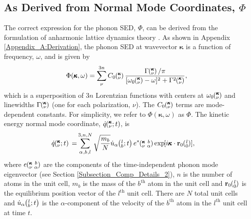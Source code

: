 \subsection{\label{S:Subsection_NMD}As Derived from Normal Mode 
Coordinates, $\Phi$}
The correct expression for the phonon SED, $\Phi$, can be derived from 
the formulation of anharmonic 
lattice dynamics theory 
\cite{maradudin_dynamical_1974,wallace_thermodynamics_1972,
dove_introduction_1993,srivastava_physics_1990}. 
As shown in Appendix \ref{Appendix_A:Derivation}, 
the phonon SED at wavevector $\pmb{\kappa}$ 
is a function of frequency, $\omega$, 
and is given by
\begin{equation}\label{E:Lorentzian_NMD}
\begin{split}
\Phi(\pmb{\kappa},\omega) = \sum_{\nu}^{3n}C_0\kv\frac{\Gamma\kv/\pi}
{[\omega_0\kv-\omega]^2+\Gamma^2\kv},
\end{split}
\end{equation}
which is a superposition of $3n$ Lorentzian functions with centers at 
$\omega_0\mspace{-4.0mu}\left(\mspace{-8.0mu} \begin{smallmatrix}&\pmb{\kappa} \\&\nu\end{smallmatrix} \mspace{-3.0mu}\right)$ and linewidths 
$\Gamma \mspace{-4.0mu}\left(\mspace{-8.0mu} \begin{smallmatrix}&\pmb{\kappa} \\&\nu\end{smallmatrix} \mspace{-3.0mu}\right)$ (one for each polarization, $\nu$). The $C_0 \mspace{-4.0mu}\left(\mspace{-8.0mu} \begin{smallmatrix}&\pmb{\kappa} \\&\nu\end{smallmatrix} \mspace{-3.0mu}\right)$ terms 
are mode-dependent constants. 
For simplicity, we refer to $\Phi(\pmb{\kappa},\omega)$ as $\Phi$. 
The kinetic energy normal mode coordinate, $\dot{q}\mspace{-4.0mu}\left(\mspace{-8.0mu} \begin{smallmatrix}&\pmb{\kappa} \\&\nu\end{smallmatrix} \mspace{-2.0mu};t\right)$, is 
\cite{dove_introduction_1993}
\begin{equation}\label{E:qdot_HLD}
\begin{split}
\dot{q}\kvt{}{}{}=&\SUM{0}{}\sqrt{\frac{m_b}{N}}\dot{u}_{\alpha}\lbt 
e^*\kvba\EXP{i\pmb{\kappa}\cdot\mathbf{r}_0\ab{l}{0}},
\end{split}
\end{equation}
where $e\mspace{-4.0mu}\left(\mspace{-8.0mu} \begin{smallmatrix} &\pmb{\kappa} &b \\ &\nu &\alpha\end{smallmatrix} \mspace{-3.0mu}\right)$ are the components of the time-independent phonon mode 
eigenvector (see Section \ref{Subsection_Comp_Details_2}), 
$n$ is the number of atoms in the unit cell, 
$m_b$ is the mass of the $b^{\textrm{th}}$ atom in the unit cell and
$\mathbf{r}_0\ab{l}{0}$ is the equilibrium position vector of the
$l^{\textrm{th}}$ unit cell. There are $N$ total unit cells and 
$\dot{u}_{\alpha}\mspace{-4.0mu}\left(\mspace{-8.0mu} \begin{smallmatrix}&l \\&b\end{smallmatrix}\mspace{-2.0mu};t\right)$ 
is the $\alpha$-component of the velocity of the
$b^{\textrm{th}}$ atom in the $l^{\textrm{th}}$ unit cell at time $t$.

